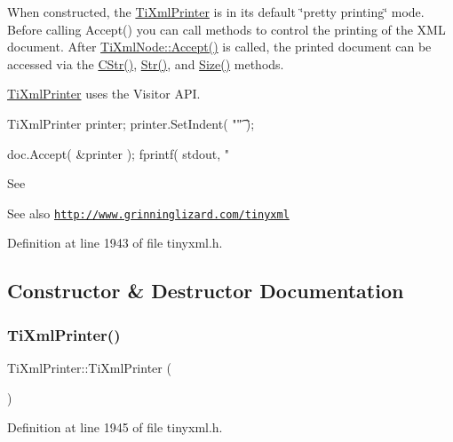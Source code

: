 When constructed, the \hyperlink{class_ti_xml_printer}{Ti\+Xml\+Printer} is in its default \char`\"{}pretty printing\char`\"{} mode. Before calling Accept() you can call methods to control the printing of the X\+ML document. After \hyperlink{class_ti_xml_node_acc0f88b7462c6cb73809d410a4f5bb86}{Ti\+Xml\+Node\+::\+Accept()} is called, the printed document can be accessed via the \hyperlink{class_ti_xml_printer_a859eede9597d3e0355b77757be48735e}{C\+Str()}, \hyperlink{class_ti_xml_printer_a3bd4daf44309b41f5813a833caa0d1c9}{Str()}, and \hyperlink{class_ti_xml_printer_ad01375ae9199bd2f48252eaddce3039d}{Size()} methods.

\hyperlink{class_ti_xml_printer}{Ti\+Xml\+Printer} uses the Visitor A\+PI. \begin{DoxyVerb}TiXmlPrinter printer;
printer.SetIndent( "\t" );

doc.Accept( &printer );
fprintf( stdout, "%
\end{DoxyVerb}


See \begin{DoxySeeAlso}{See also}
\href{http://www.grinninglizard.com/tinyxml}{\tt http\+://www.\+grinninglizard.\+com/tinyxml} 
\end{DoxySeeAlso}


Definition at line 1943 of file tinyxml.\+h.



\subsection{Constructor \& Destructor Documentation}
\hypertarget{class_ti_xml_printer_a6539b864026c8667cd0bd5fdf4b41f43}{}\label{class_ti_xml_printer_a6539b864026c8667cd0bd5fdf4b41f43} 
\subsubsection{\texorpdfstring{Ti\+Xml\+Printer()}{TiXmlPrinter()}}
{\footnotesize\ttfamily Ti\+Xml\+Printer\+::\+Ti\+Xml\+Printer (\begin{DoxyParamCaption}{ }\end{DoxyParamCaption})\hspace{0.3cm}{\ttfamily [inline]}}



Definition at line 1945 of file tinyxml.\+h.



